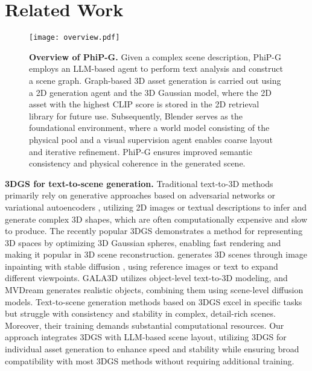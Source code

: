 \section{Related Work}
\begin{figure*}[!h]
\begin{center}
\centerline{\texttt{[image: overview.pdf]}}
\vskip -0.2in
\caption{\textbf{Overview of PhiP-G.} Given a complex scene description, PhiP-G employs an LLM-based agent to perform text analysis and construct a scene graph. Graph-based 3D asset generation is carried out using a 2D generation agent and the 3D Gaussian model, where the 2D asset with the highest CLIP score is stored in the 2D retrieval library for future use. 
Subsequently, Blender serves as the foundational environment, where a  world model consisting of the physical pool and a visual supervision agent enables coarse layout and iterative refinement. PhiP-G ensures improved semantic consistency and physical coherence in the generated scene.}
\label{overview}  
\end{center}
\vskip -0.4in
\end{figure*}
\textbf{3DGS for text-to-scene generation.}
Traditional text-to-3D methods primarily rely on generative approaches based on adversarial networks or variational autoencoders \citep{gan1,gan2,ferreira2022gan,VAE1,VAE2,petrovich2021action}, utilizing 2D images or textual descriptions to infer and generate complex 3D shapes, which are often computationally expensive and slow to produce. The recently popular 3DGS \citep{Splatting} demonstrates a method for representing 3D spaces by optimizing 3D Gaussian spheres, enabling fast rendering and making it popular in 3D scene reconstruction. \citep{chung2023luciddreamer} generates 3D scenes through image inpainting with stable diffusion \citep{stablediffusion}, using reference images or text to expand different viewpoints. GALA3D \citep{Gala3d} utilizes object-level text-to-3D modeling, and MVDream \citep{MVDream} generates realistic objects, combining them using scene-level diffusion models. Text-to-scene generation methods based on 3DGS excel in specific tasks but struggle with consistency and stability in complex, detail-rich scenes. Moreover, their training demands substantial computational resources. Our approach integrates 3DGS with LLM-based scene layout, utilizing 3DGS for individual asset generation to enhance speed and stability while ensuring broad compatibility with most 3DGS methods without requiring additional training.

